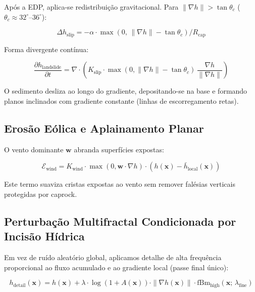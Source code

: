 \documentclass[11pt,a4paper]{article}
\begin{document}
Após a EDP, aplica-se redistribuição gravitacional. Para $\|\nabla h\| > \tan\theta_c$
($\theta_c \approx 32^\circ$--$36^\circ$):

\begin{equation}
  \Delta h_{\text{slip}} = -\alpha \cdot \max\!\left(0,\, \|\nabla h\| - \tan\theta_c\right) / R_{\text{cap}}
  \label{eq:landslide}
\end{equation}

Forma divergente contínua:

\begin{equation}
  \frac{\partial h_{\text{landslide}}}{\partial t}
  = \nabla \cdot \left(K_{\text{slip}} \cdot \max(0, \|\nabla h\| - \tan\theta_c)\, \frac{\nabla h}{\|\nabla h\|}\right)
  \label{eq:landslide-pde}
\end{equation}

O sedimento desliza ao longo do gradiente, depositando-se na base e formando planos
inclinados com gradiente constante (linhas de escorregamento retas).

\subsection{Erosão Eólica e Aplainamento Planar}

O vento dominante $\mathbf{w}$ abranda superfícies expostas:

\begin{equation}
  \mathcal{E}_{\text{wind}} = K_{\text{wind}} \cdot \max(0, \mathbf{w}\cdot\nabla h)
  \cdot (h(\mathbf{x}) - \bar{h}_{\text{local}}(\mathbf{x}))
  \label{eq:wind-detail}
\end{equation}

Este termo suaviza cristas expostas ao vento sem remover falésias verticais protegidas por caprock.

\subsection{Perturbação Multifractal Condicionada por Incisão Hídrica}

Em vez de ruído aleatório global, aplicamos detalhe de alta frequência proporcional ao
fluxo acumulado e ao gradiente local (passe final único):

\begin{equation}
  h_{\text{detail}}(\mathbf{x}) = h(\mathbf{x})
  + \lambda \cdot \log\!\left(1 + A(\mathbf{x})\right)
  \cdot \|\nabla h(\mathbf{x})\|
  \cdot \text{fBm}_{\text{high}}(\mathbf{x};\, \lambda_{\text{fine}})
  \label{eq:hydraulic-detail}
\end{equation}
\end{document}

